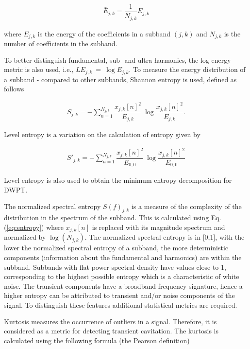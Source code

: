 \documentclass[preprint, linenumbers]{revtex4-2}
\newcommand{\eq}[1]{Eq. {(#1)} }
\begin{document}
\begin{align}
	\label{eq:avg_energy}                      
	\bar{E}_{j,k} = \dfrac{1}{N_{j,k}} E_{j,k} 
\end{align}

\noindent where $E_{j,k}$ is the energy of the coefficients in a subband $(j,k)$ and $N_{j,k}$ is the number of coefficients in the subband.

To better distinguish fundamental, sub- and ultra-harmonics, the log-energy metric is also used, i.e., $LE_{j,k}~=~ \log{E_{j,k}}$. To measure the energy distribution of a subband - compared to other subbands, Shannon entropy is used, defined as follows

\begin{align}
	\label{eq:entropy}                                                                                   
	S_{j,k} = -\sum_{n=1}^{N_{j,k}} \dfrac{x_{j,k}[n]^2}{E_{j,k}} ~ \log{\dfrac{x_{j,k}[n]^2}{E_{j,k}}}. 
\end{align}

Level entropy is a variation on the calculation of entropy given by

\begin{align}
	\label{eq:level_entropy}                                                                             
	S'_{j,k} = -\sum_{n=1}^{N_{j,k}} \dfrac{x_{j,k}[n]^2}{E_{0,0}} ~ \log{\dfrac{x_{j,k}[n]^2}{E_{0,0}}} 
\end{align}

\noindent Level entropy is also used to obtain the minimum entropy decomposition for DWPT.

The normalized spectral entropy $S(f)_{j,k}$ is a measure of the complexity of the distribution in the spectrum of the subband. This is calculated using \eq{\ref{eq:entropy}} where $x_{j,k}[n]$ is replaced with its magnitude spectrum and normalized by $\log(N_{j,k})$. The normalized spectral entropy is in [0,1], with the lower the normalized spectral entropy of a subband, the more deterministic components (information about the fundamental and harmonics) are within the subband. Subbands with flat power spectral density have values close to 1, corresponding to the highest possible entropy which is a characteristic of white noise. The transient components have a broadband frequency signature, hence a higher entropy can be attributed to transient and/or noise components of the signal. To distinguish these features additional statistical metrics are required.

Kurtosis measures the occurrence of outliers in a signal. Therefore, it is considered as a metric for detecting transient cavitation. The kurtosis is calculated using the following formula (the Pearson definition)
\end{document}
